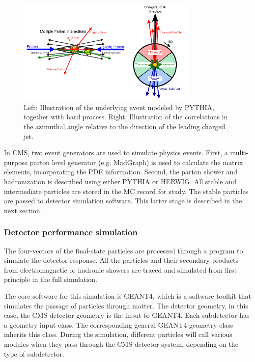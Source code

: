 \begin{figure}[htbp]
 \begin{center}
  \includegraphics[width=0.8\textwidth]{figures/c3/c3_cms_underlyingevents.png}
 \end{center}
 \caption{Left: Illustration of the underlying event modeled by PYTHIA, together with hard process. Right: Illustration of the correlations in the azimuthal angle relative to the direction of the leading charged jet.}
 \label{fig:c3cmsunderlyingevents}
\end{figure}

In CMS, two event generators are used to simulate physics events. First, a multi-purpose parton level generator (e.g. MadGraph\cite{Alwall:2011uj}) is used to calculate the matrix elements, incorporating the PDF information. Second, the parton shower and hadronization is described using either PYTHIA\cite{Sjostrand:2014zea} or HERWIG\cite{Bellm:2015jjp}. All stable and intermediate particles are stored in the MC record for study. The stable particles are passed to detector simulation software. This latter stage is described in the next section. 

\subsubsection{Detector performance simulation}

The four-vectors of the final-state particles are processed through a program to simulate the detector response. All the particles and their secondary products from electromagnetic or hadronic showers are traced and simulated from first principle in the full simulation. 

The core software for this simulation is GEANT4\cite{Agostinelli:2002hh}, which is a software toolkit that simulates the passage of particles through matter. The detector geometry, in this case, the CMS detector geometry\cite{Lefebure:1999wja} is the input to GEANT4. Each subdetector has a geometry input class. The corresponding general GEANT4 geometry class inherits this class. During the simulation, different particles will call various modules when they pass through the CMS detector system, depending on the type of subdetector. 

